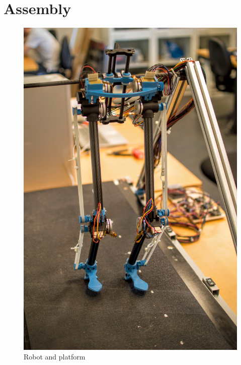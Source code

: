 \section{Assembly} %
\label{sec:assembly}

\begin{figure}[tb]
  \centering
  \includegraphics[width=\textwidth]{figures/photo_robot.jpg}
  \caption{Robot and platform}
  \label{fig:robot}
\end{figure}

